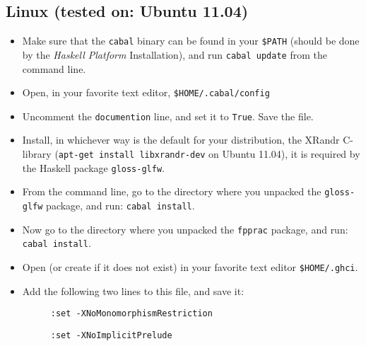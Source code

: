 \documentclass[]{article}
\begin{document}
\subsection{Linux (tested on: Ubuntu 11.04)}
\begin{itemize}
  \item Make sure that the \texttt{cabal} binary can be found in your \texttt{\$PATH} (should be done by the \emph{Haskell Platform} Installation), and run \texttt{cabal update} from the command line.
  \item Open, in your favorite text editor, \texttt{\$HOME/.cabal/config}
  \item Uncomment the \texttt{documention} line, and set it to \texttt{True}. Save the file.
  \item Install, in whichever way is the default for your distribution, the XRandr C-library (\texttt{apt-get install libxrandr-dev} on Ubuntu 11.04), it is required by the Haskell package \texttt{gloss-glfw}.
  \item From the command line, go to the directory where you unpacked the \texttt{gloss-glfw} package, and run: \texttt{cabal install}.
  \item Now go to the directory where you unpacked the \texttt{fpprac} package, and run: \texttt{cabal install}.
  \item Open (or create if it does not exist) in your favorite text editor \texttt{\$HOME/.ghci}.
  \item Add the following two lines to this file, and save it:
  \begin{description}
    \item[] \texttt{:set -XNoMonomorphismRestriction}
    \item[] \texttt{:set -XNoImplicitPrelude}
  \end{description}
\end{itemize}
\end{document}
